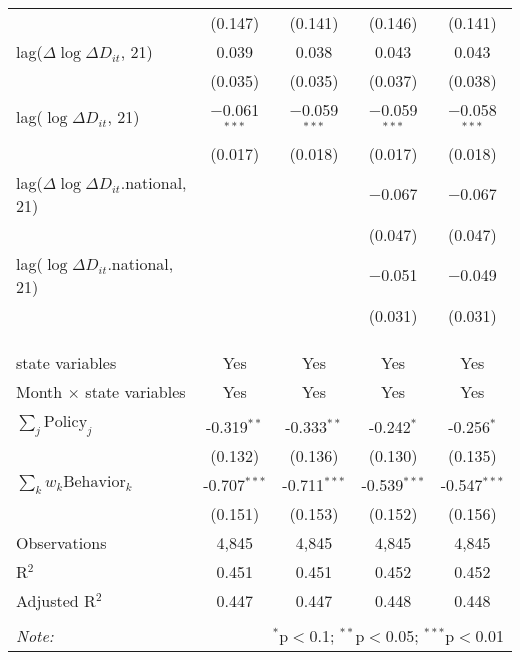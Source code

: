 \begin{tabular}{@{\extracolsep{1pt}}lcccc}
  & (0.147) & (0.141) & (0.146) & (0.141) \\ 
  lag($\Delta \log \Delta D_{it}$, 21) & 0.039 & 0.038 & 0.043 & 0.043 \\ 
  & (0.035) & (0.035) & (0.037) & (0.038) \\ 
  lag($\log \Delta D_{it}$, 21) & $-$0.061$^{***}$ & $-$0.059$^{***}$ & $-$0.059$^{***}$ & $-$0.058$^{***}$ \\ 
  & (0.017) & (0.018) & (0.017) & (0.018) \\ 
  lag($\Delta \log \Delta D_{it}$.national, 21) &  &  & $-$0.067 & $-$0.067 \\ 
  &  &  & (0.047) & (0.047) \\ 
  lag($\log \Delta D_{it}$.national, 21) &  &  & $-$0.051 & $-$0.049 \\ 
  &  &  & (0.031) & (0.031) \\ 
   &  &  &  &  \\ 
  &  &  &  &  \\ 
 \hline \\[-1.8ex] 
state variables & Yes & Yes & Yes & Yes \\ 
Month $\times$ state variables & Yes & Yes & Yes & Yes \\ 
\hline \\[-1.8ex] 
$\sum_j \mathrm{Policy}_j$ & -0.319$^{**}$ & -0.333$^{**}$ & -0.242$^{*}$ & -0.256$^{*}$ \\ 
 & (0.132) & (0.136) & (0.130) & (0.135) \\ 
$\sum_k w_k \mathrm{Behavior}_k$ & -0.707$^{***}$ & -0.711$^{***}$ & -0.539$^{***}$ & -0.547$^{***}$ \\ 
 & (0.151) & (0.153) & (0.152) & (0.156) \\ 
Observations & 4,845 & 4,845 & 4,845 & 4,845 \\ 
R$^{2}$ & 0.451 & 0.451 & 0.452 & 0.452 \\ 
Adjusted R$^{2}$ & 0.447 & 0.447 & 0.448 & 0.448 \\ 
\hline 
\hline \\[-1.8ex] 
\textit{Note:}  & \multicolumn{4}{r}{$^{*}$p$<$0.1; $^{**}$p$<$0.05; $^{***}$p$<$0.01} \\ 
\end{tabular} 